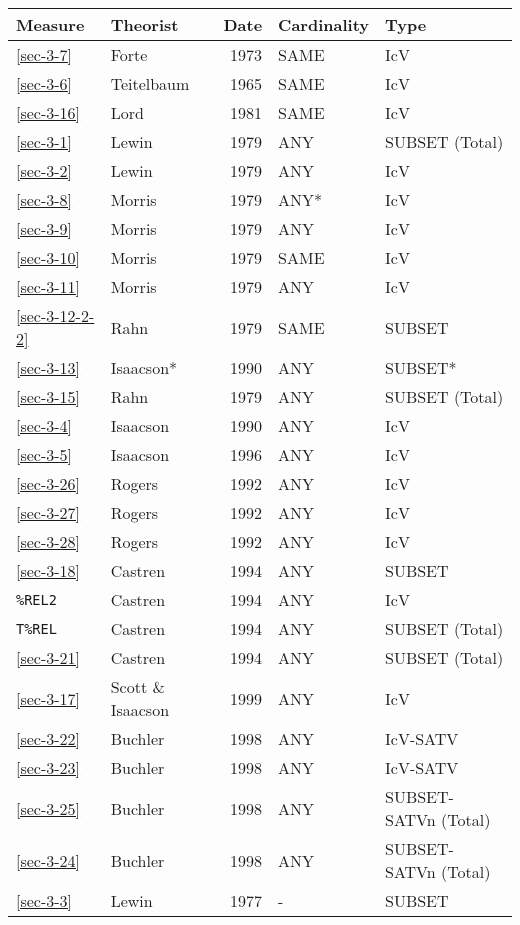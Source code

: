\documentclass[11pt]{article}
\begin{document}
\begin{center}
\begin{tabular}{llrll}
Measure & Theorist & Date & Cardinality & Type\\
\hline
\ref{sec-3-7} & Forte & 1973 & SAME & IcV\\
\ref{sec-3-6} & Teitelbaum & 1965 & SAME & IcV\\
\ref{sec-3-16} & Lord & 1981 & SAME & IcV\\
\ref{sec-3-1} & Lewin & 1979 & ANY & SUBSET (Total)\\
\ref{sec-3-2} & Lewin & 1979 & ANY & IcV\\
\ref{sec-3-8} & Morris & 1979 & ANY* & IcV\\
\ref{sec-3-9} & Morris & 1979 & ANY & IcV\\
\ref{sec-3-10} & Morris & 1979 & SAME & IcV\\
\ref{sec-3-11} & Morris & 1979 & ANY & IcV\\
\ref{sec-3-12-2-2} & Rahn & 1979 & SAME & SUBSET\\
\ref{sec-3-13} & Isaacson* & 1990 & ANY & SUBSET*\\
\ref{sec-3-15} & Rahn & 1979 & ANY & SUBSET (Total)\\
\ref{sec-3-4} & Isaacson & 1990 & ANY & IcV\\
\ref{sec-3-5} & Isaacson & 1996 & ANY & IcV\\
\ref{sec-3-26} & Rogers & 1992 & ANY & IcV\\
\ref{sec-3-27} & Rogers & 1992 & ANY & IcV\\
\ref{sec-3-28} & Rogers & 1992 & ANY & IcV\\
\ref{sec-3-18} & Castren & 1994 & ANY & SUBSET\\
\texttt{\%REL2} & Castren & 1994 & ANY & IcV\\
\texttt{T\%REL} & Castren & 1994 & ANY & SUBSET (Total)\\
\ref{sec-3-21} & Castren & 1994 & ANY & SUBSET (Total)\\
\ref{sec-3-17} & Scott \& Isaacson & 1999 & ANY & IcV\\
\ref{sec-3-22} & Buchler & 1998 & ANY & IcV-SATV\\
\ref{sec-3-23} & Buchler & 1998 & ANY & IcV-SATV\\
\ref{sec-3-25} & Buchler & 1998 & ANY & SUBSET-SATVn (Total)\\
\ref{sec-3-24} & Buchler & 1998 & ANY & SUBSET-SATVn (Total)\\
\ref{sec-3-3} & Lewin & 1977 & - & SUBSET\\
\end{tabular}
\end{center}
\end{document}
